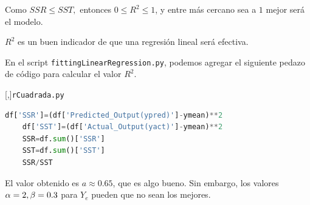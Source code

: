 Como $SSR\leq SST,$ entonces $0\leq R^{2} \leq 1$, y entre más cercano sea a $1$ mejor será el modelo.



$R^{2}$ es un buen indicador de que una regresión lineal será efectiva.


En el script \texttt{fittingLinearRegression.py}, podemos agregar el siguiente pedazo de código para calcular el valor $R^{2}$.

[,]{\texttt{rCuadrada.py}}
\begin{lstlisting}[language=Python]
	df['SSR']=(df['Predicted_Output(ypred)']-ymean)**2
	df['SST']=(df['Actual_Output(yact)']-ymean)**2
	SSR=df.sum()['SSR']
	SST=df.sum()['SST']
	SSR/SST
\end{lstlisting}


El valor obtenido es $a\approx 0.65$, que es algo bueno. Sin embargo, los valores $\alpha=2, \beta=0.3$ para $Y_{e}$ pueden que no sean los mejores.
